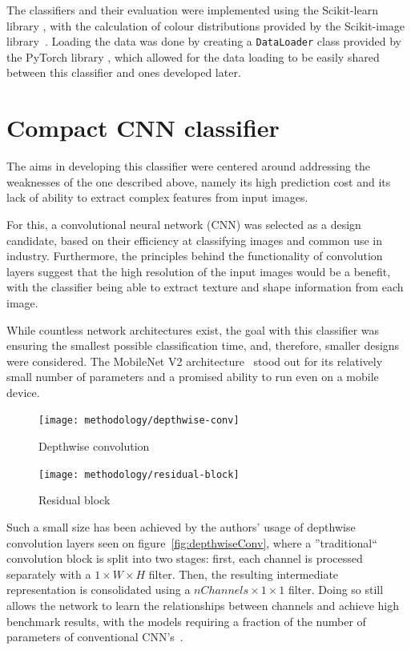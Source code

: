 The classifiers and their evaluation were implemented using the Scikit-learn library \cite{sklearnLibrary}, with the calculation of colour
distributions provided by the Scikit-image library~\cite{skImageLibrary}.
Loading the data was done by creating a \verb|DataLoader| class provided by the PyTorch library \cite{pytorchLibrary}, which allowed
for the data loading to be easily shared between this classifier and ones developed later.
\section{Compact CNN classifier}
\label{sec:deep-learning}
The aims in developing this classifier were centered around addressing the weaknesses of the one described above,
namely its high prediction cost and its lack of ability to extract complex features from input images.

For this, a convolutional neural network (CNN) was selected as a design candidate, based on their
efficiency at classifying images and common use in industry.
Furthermore, the principles behind the functionality of convolution layers suggest that the high resolution of the input
images would be a benefit, with the classifier being able to extract texture and shape information from each image.

While countless network architectures exist, the goal with this classifier was ensuring the smallest possible classification time,
and, therefore, smaller designs were considered.
The MobileNet V2 architecture~\cite{mobileNet} stood out for its relatively small number of parameters and a promised ability to run even on
a mobile device.

\begin{figure}
    \centering
    \texttt{[image: methodology/depthwise-conv]}
    \caption[Depthwise convolution]{Depthwise convolution~\cite{mobileNet}}
    \label{fig:depthwiseConv}
    \vspace{0.5em}
    \texttt{[image: methodology/residual-block]}
    \caption[Residual block]{Residual block~\cite{resNet}}
    \label{fig:residualBlock}
    \vspace{-1em}
\end{figure}

Such a small size has been achieved by the authors' usage of depthwise convolution layers seen on figure~\ref{fig:depthwiseConv},
where a ''traditional`` convolution block is split into two stages: first, each channel is processed separately with a $1 \times W \times H$ filter.
Then, the resulting intermediate representation is consolidated using a $nChannels \times 1 \times 1$ filter.
Doing so still allows the network to learn the relationships between channels and achieve high benchmark results, with the models requiring
a fraction of the number of parameters of conventional CNN's~\cite{mobileNet}.

